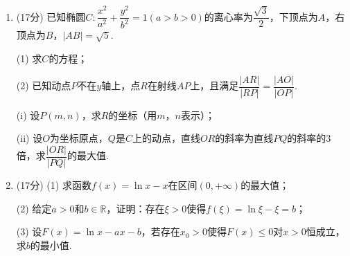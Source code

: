 \documentclass[12pt,a4paper]{article}
\begin{document}
\begin{enumerate}[leftmargin=*,label=\arabic*.,resume,itemsep=1.2ex]
		(1) 证明：平面$PBC\perp$平面$PAB$；
		
		(2) 设$PA=AB=BC=2$，且点$A$，$B$，$C$，$D$均在球$O$的球面上. 
		
		(i) 证明：点$O$在平面$ABCD$内；
		
		(ii) 求直线$PO$与$BC$所成角的余弦值. 
		
		\item (17分) 已知椭圆$C:\dfrac{x^2}{a^2}+\dfrac{y^2}{b^2}=1(a>b>0)$的离心率为$\dfrac{\sqrt{3}}{2}$，下顶点为$A$，右顶点为$B$，$|AB|=\sqrt{5}$. 
		
		(1) 求$C$的方程；
		
		(2) 已知动点$P$不在$y$轴上，点$R$在射线$AP$上，且满足$\dfrac{\left| AR\right| }{\left| RP\right| }=\dfrac{|AO|}{|OP|}$. 
		
		(i) 设$P(m,n)$，求$R$的坐标（用$m$，$n$表示）；
		
		(ii) 设$O$为坐标原点，$Q$是$C$上的动点，直线$OR$的斜率为直线$PQ$的斜率的3倍，求$\dfrac{|OR|}{|PQ|}$的最大值. 
		
		\item (17分) 
		(1) 求函数$f(x)=\ln x - x$在区间$(0,+\infty)$的最大值；
		
		(2) 给定$a>0$和$b\in\mathbb{R}$，证明：存在$\xi>0$使得$f(\xi)=\ln\xi-\xi=b$；
		
		(3) 设$F(x)=\ln x - ax - b$，若存在$x_0>0$使得$F(x)\leq 0$对$x>0$恒成立，求$b$的最小值. 
	\end{enumerate}
\end{document}
